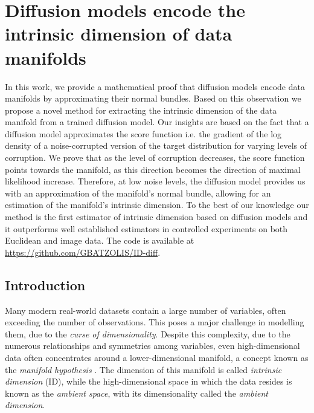 \chapter{Diffusion models encode the intrinsic dimension of data manifolds}

\ifpdf
    \graphicspath{{Chapter3/Figs/Raster/}{Chapter3/Figs/PDF/}{Chapter3/Figs/}}
\else
    \graphicspath{{Chapter3/Figs/Vector/}{Chapter3/Figs/}}
\fi

In this work, we provide a mathematical proof that diffusion models encode data manifolds by approximating their normal bundles. Based on this observation we propose a novel method for extracting the intrinsic dimension of the data manifold from a trained diffusion model. Our insights are based  on the fact that a diffusion model approximates the score function i.e. the gradient of the log density of a noise-corrupted version of the target distribution for varying levels of corruption. We prove that as the level of corruption decreases, the score function points towards the manifold, as this direction becomes the direction of maximal likelihood increase. Therefore, at low noise levels, the diffusion model provides us with an approximation of the manifold's normal bundle, allowing for an estimation of the manifold's intrinsic dimension.  To the best of our knowledge our method is the first estimator of intrinsic dimension based on diffusion models and it outperforms well established estimators in controlled experiments on both Euclidean and image data. The code is available at \url{https://github.com/GBATZOLIS/ID-diff}.

\section{Introduction}\label{ch3:sec:introduction}

Many modern real-world datasets contain a large number of variables, often exceeding the number of observations. This poses a major challenge in modelling them, due to the \textit{curse of dimensionality}. Despite this complexity,  due to the numerous relationships and symmetries among variables, even high-dimensional data often concentrates around a lower-dimensional manifold, a concept known as the \textit{manifold hypothesis} 
\cite{manifold_hypothesis}. The dimension of this manifold is called \textit{intrinsic dimension} (ID),  while the high-dimensional space in which the data resides is known as the
\textit{ambient space}, with its dimensionality called the \textit{ambient dimension}.

